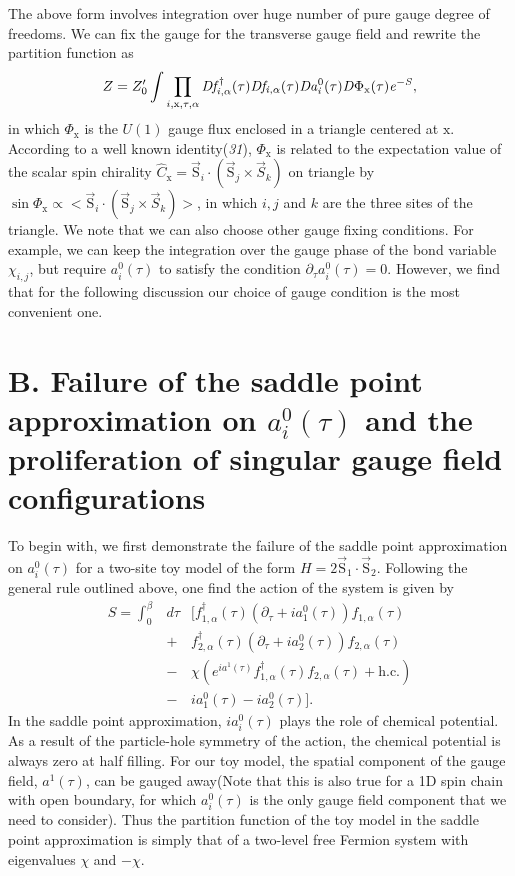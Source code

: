 \documentclass[12pt]{article}
\begin{document}
The above form involves integration over huge number of pure gauge degree of freedoms. We can fix the gauge for the transverse gauge field and rewrite the partition function as
 \begin{eqnarray}
 Z= Z'_{0} \int \prod_{i,\mathrm{x},\tau,\alpha} \it{D}f^{\dagger}_{i,\alpha}(\tau)\it{D}f_{i,\alpha}(\tau)\it{D}a^{\mathrm{0}}_{i}(\tau) \it{D}\mathrm{\Phi}_{\mathrm{x}}(\tau) e^{-S}, \nonumber
 \end{eqnarray}
 in which $\Phi_{\mathrm{x}}$ is the $U(1)$ gauge flux enclosed in a triangle centered at $\mathrm{x}$. According to a well known identity({\it 31\/}), $\Phi_{\mathrm{x}}$ is related to the expectation value of the scalar spin chirality $\hat{C}_{\mathrm{x}}=\vec{\mathrm{S}}_{i}\cdot (\vec{\mathrm{S}}_{j} \times \vec{S}_{k})$ on triangle by  $\sin \Phi_{\mathrm{x}} \propto  <\vec{\mathrm{S}}_{i}\cdot (\vec{\mathrm{S}}_{j} \times \vec{S}_{k})>$, in which $i,j$ and $k$ are the three sites of the triangle. We note that we can also choose other gauge fixing conditions. For example, we can keep the integration over the gauge phase of the bond variable $\chi_{i,j}$, but require $a^{0}_{i}(\tau)$ to satisfy the condition $\partial_{\tau} a^{0}_{i}(\tau)=0$. However, we find that for the following discussion our choice of gauge condition is the most convenient one.


\section*{B. Failure of the saddle point approximation on $a^{0}_{i}(\tau)$ and the proliferation of singular gauge field configurations}

To begin with, we first demonstrate the failure of the saddle point approximation on $a^{0}_{i}(\tau)$ for a two-site toy model of the form $H=2\vec{\mathrm{S}}_{1}\cdot\vec{\mathrm{S}}_{2}$.  Following the general rule outlined above, one find the action of the system is given by
\begin{eqnarray}
S= \int_{0}^{\beta} &d\tau& [f^{\dagger}_{1,\alpha}(\tau)(\partial_{\tau}+ia^{0}_{1}(\tau))f_{1,\alpha}(\tau)\nonumber\\
 &+& f^{\dagger}_{2,\alpha}(\tau)(\partial_{\tau}+ia^{0}_{2}(\tau))f_{2,\alpha}(\tau)\nonumber\\
 &-&\chi (e^{ia^{1}(\tau)} f^{\dagger}_{1,\alpha}(\tau)f_{2,\alpha}(\tau)+\mathrm{h.c.})\nonumber\\
 &-&ia^{0}_{1}(\tau)-ia^{0}_{2}(\tau)].\nonumber
 \end{eqnarray}  
In the saddle point approximation, $ia^{0}_{i}(\tau)$ plays the role of chemical potential. As a result of the particle-hole symmetry of the action, the chemical potential is always zero at half filling. For our toy model, the spatial component of the gauge field, $a^{1}(\tau)$, can be gauged away(Note that this is also true for a 1D spin chain with open boundary, for which $a^{0}_{i}(\tau)$ is the only gauge field component that we need to consider). Thus the partition function of the toy model in the saddle point approximation is simply that of a two-level free Fermion system with eigenvalues $\chi$ and $-\chi$. 
\end{document}
